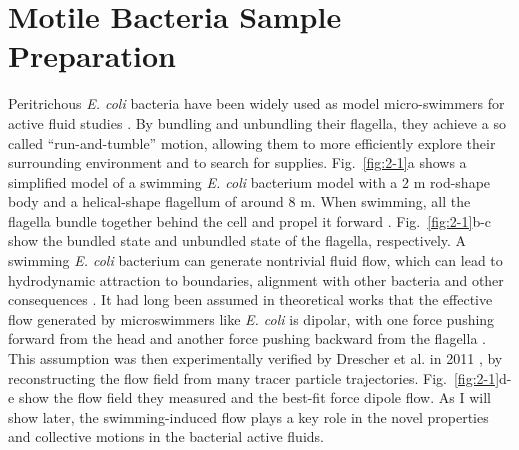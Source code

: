 \section{Motile Bacteria Sample Preparation}
\label{motile-bacteria-sample-preparation}
Peritrichous \textit{E. coli} bacteria have been widely used as model micro-swimmers for active fluid studies \cite{Poon2012, Schwarz-Linek2016}. By bundling and unbundling their flagella, they achieve a so called ``run-and-tumble'' motion, allowing them to more efficiently explore their surrounding environment and to search for supplies. Fig.~\ref{fig:2-1}a shows a simplified model of a swimming \textit{E. coli} bacterium model with a 2 \textmu m rod-shape body and a helical-shape flagellum of around 8 \textmu m. When swimming, all the flagella bundle together behind the cell and propel it forward \cite{Lauga2015}. Fig.~\ref{fig:2-1}b-c show the bundled state and unbundled state of the flagella, respectively. A swimming \textit{E. coli} bacterium can generate nontrivial fluid flow, which can lead to hydrodynamic attraction to boundaries, alignment with other bacteria and other consequences \cite{Elgeti2015}. It had long been assumed in theoretical works that the effective flow generated by microswimmers like \textit{E. coli} is dipolar, with one force pushing forward from the head and another force pushing backward from the flagella
\cite{Simha2002, Ishikawa2007, Saintillan2008a, Saintillan2008b}. This assumption was then experimentally verified by Drescher et al. in 2011 \cite{Drescher2011}, by reconstructing the flow field from many tracer particle trajectories. Fig.~\ref{fig:2-1}d-e show the flow field they measured and the best-fit force dipole flow. As I will show later, the swimming-induced flow plays a key role in the novel properties and collective motions in the bacterial active fluids.

